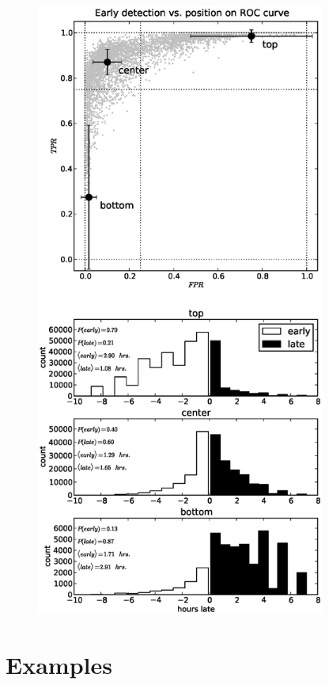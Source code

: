 \begin{figure}[!h]
\begin{center}
\includegraphics[height=8in]{../fig/final/early_vs_roc}
\end{center}
\caption{\label{fig:early_vs_roc}}
\end{figure}

\clearpage
\section{Examples} %


